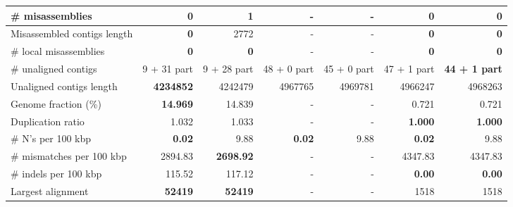 \documentclass[12pt,a4paper]{article}
\begin{document}
\begin{table}[ht]
\begin{center}
\begin{tabular}{|l*{6}{|r}|}
\# misassemblies & {\bf 0} & 1 & - & - & {\bf 0} & {\bf 0} \\ \hline
Misassembled contigs length & {\bf 0} & 2772 & - & - & {\bf 0} & {\bf 0} \\ \hline
\# local misassemblies & {\bf 0} & {\bf 0} & - & - & {\bf 0} & {\bf 0} \\ \hline
\# unaligned contigs & 9 + 31 part & 9 + 28 part & 48 + 0 part & 45 + 0 part & 47 + 1 part & {\bf 44 + 1 part} \\ \hline
Unaligned contigs length & {\bf 4234852} & 4242479 & 4967765 & 4969781 & 4966247 & 4968263 \\ \hline
Genome fraction (\%) & {\bf 14.969} & 14.839 & - & - & 0.721 & 0.721 \\ \hline
Duplication ratio & 1.032 & 1.033 & - & - & {\bf 1.000} & {\bf 1.000} \\ \hline
\# N's per 100 kbp & {\bf 0.02} & 9.88 & {\bf 0.02} & 9.88 & {\bf 0.02} & 9.88 \\ \hline
\# mismatches per 100 kbp & 2894.83 & {\bf 2698.92} & - & - & 4347.83 & 4347.83 \\ \hline
\# indels per 100 kbp & 115.52 & 117.12 & - & - & {\bf 0.00} & {\bf 0.00} \\ \hline
Largest alignment & {\bf 52419} & {\bf 52419} & - & - & 1518 & 1518 \\ \hline
\end{tabular}
\end{center}
\end{table}
\end{document}
